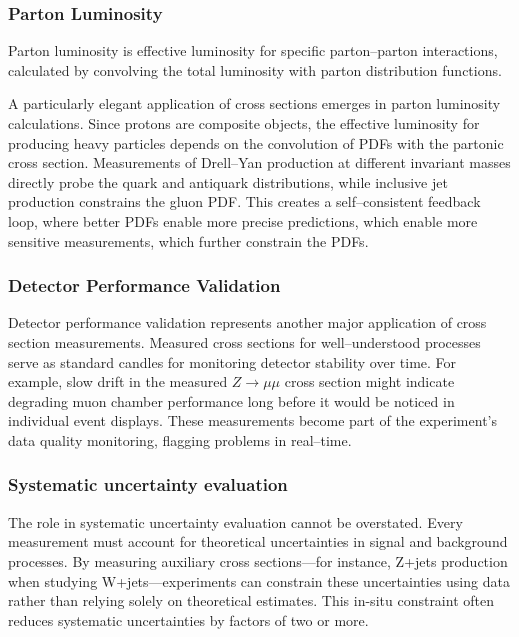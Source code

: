         \subsubsection{Parton Luminosity}
            Parton luminosity is effective luminosity for specific parton--parton interactions, calculated by convolving the total luminosity with parton distribution functions.

            A particularly elegant application of cross sections emerges in parton luminosity calculations.
            Since protons are composite objects, the effective luminosity for producing heavy particles depends on the convolution of PDFs with the partonic cross section.
            Measurements of Drell--Yan production at different invariant masses directly probe the quark and antiquark distributions, while inclusive jet production constrains the gluon PDF.
            This creates a self--consistent feedback loop, where better PDFs enable more precise predictions, which enable more sensitive measurements, which further constrain the PDFs.
            
        \subsubsection{Detector Performance Validation}
             Detector performance validation represents another major application of cross section measurements.
             Measured cross sections for well--understood processes serve as standard candles for monitoring detector stability over time.
             For example, slow drift in the measured \(Z\to\mu\mu\) cross section might indicate degrading muon chamber performance long before it would be noticed in individual event displays.
             These measurements become part of the experiment's data quality monitoring, flagging problems in real--time.
            \subsubsection{Systematic uncertainty evaluation}
                The role in systematic uncertainty evaluation cannot be overstated. Every measurement must account for theoretical uncertainties in signal and background processes. By measuring auxiliary cross sections—for instance, Z+jets production when studying W+jets—experiments can constrain these uncertainties using data rather than relying solely on theoretical estimates. This in-situ constraint often reduces systematic uncertainties by factors of two or more.
